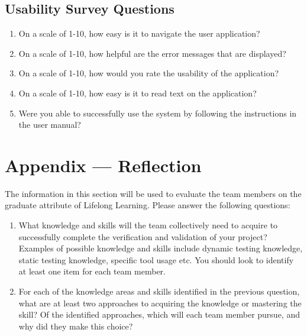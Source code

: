 \documentclass[12pt, titlepage]{article}
\begin{document}
\subsection{Usability Survey Questions}


\begin{enumerate}

\item On a scale of 1-10, how easy is it to navigate the user application?

\item On a scale of 1-10, how helpful are the error messages that are displayed?

\item On a scale of 1-10, how would you rate the usability of the application?

\item On a scale of 1-10, how easy is it to read text on the application?

\item Were you able to successfully use the system by following the instructions in the user manual?

\end{enumerate}

\newpage{}
\section*{Appendix --- Reflection}

The information in this section will be used to evaluate the team members on the
graduate attribute of Lifelong Learning.  Please answer the following questions:

\begin{enumerate}
  \item What knowledge and skills will the team collectively need to acquire to
  successfully complete the verification and validation of your project?
  Examples of possible knowledge and skills include dynamic testing knowledge,
  static testing knowledge, specific tool usage etc.  You should look to
  identify at least one item for each team member.
  \item For each of the knowledge areas and skills identified in the previous
  question, what are at least two approaches to acquiring the knowledge or
  mastering the skill?  Of the identified approaches, which will each team
  member pursue, and why did they make this choice?
\end{enumerate}
\end{document}
